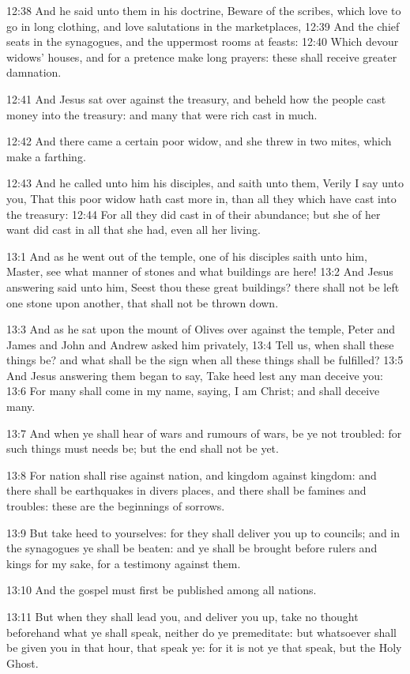 12:38 And he said unto them in his doctrine, Beware of the scribes, which love to go in long clothing, and love salutations in the marketplaces, 12:39 And the chief seats in the synagogues, and the uppermost rooms at feasts: 12:40 Which devour widows' houses, and for a pretence make long prayers: these shall receive greater damnation.

12:41 And Jesus sat over against the treasury, and beheld how the people cast money into the treasury: and many that were rich cast in much.

12:42 And there came a certain poor widow, and she threw in two mites, which make a farthing.

12:43 And he called unto him his disciples, and saith unto them, Verily I say unto you, That this poor widow hath cast more in, than all they which have cast into the treasury: 12:44 For all they did cast in of their abundance; but she of her want did cast in all that she had, even all her living.

13:1 And as he went out of the temple, one of his disciples saith unto him, Master, see what manner of stones and what buildings are here!  13:2 And Jesus answering said unto him, Seest thou these great buildings?  there shall not be left one stone upon another, that shall not be thrown down.

13:3 And as he sat upon the mount of Olives over against the temple, Peter and James and John and Andrew asked him privately, 13:4 Tell us, when shall these things be? and what shall be the sign when all these things shall be fulfilled?  13:5 And Jesus answering them began to say, Take heed lest any man deceive you: 13:6 For many shall come in my name, saying, I am Christ; and shall deceive many.

13:7 And when ye shall hear of wars and rumours of wars, be ye not troubled: for such things must needs be; but the end shall not be yet.

13:8 For nation shall rise against nation, and kingdom against kingdom: and there shall be earthquakes in divers places, and there shall be famines and troubles: these are the beginnings of sorrows.

13:9 But take heed to yourselves: for they shall deliver you up to councils; and in the synagogues ye shall be beaten: and ye shall be brought before rulers and kings for my sake, for a testimony against them.

13:10 And the gospel must first be published among all nations.

13:11 But when they shall lead you, and deliver you up, take no thought beforehand what ye shall speak, neither do ye premeditate: but whatsoever shall be given you in that hour, that speak ye: for it is not ye that speak, but the Holy Ghost.


